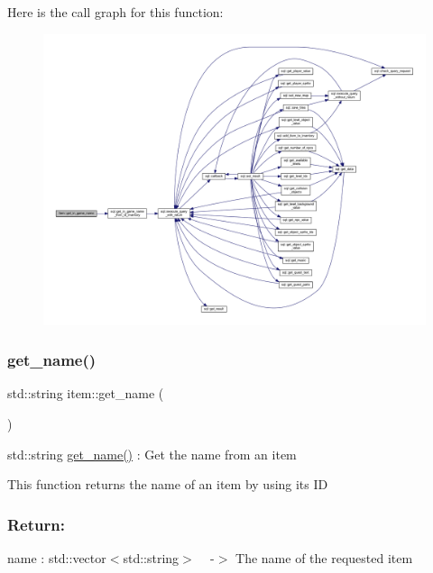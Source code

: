 Here is the call graph for this function\+:
\nopagebreak
\begin{figure}[H]
\begin{center}
\leavevmode
\includegraphics[width=350pt]{classitem_aa5a9140482a7d88d6a3eea342cb0c082_cgraph}
\end{center}
\end{figure}
\mbox{\label{classitem_ab7c2fa653e0f9a565283b60ca325f2a7}} 
\subsubsection{\texorpdfstring{get\+\_\+name()}{get\_name()}}
{\footnotesize\ttfamily std\+::string item\+::get\+\_\+name (\begin{DoxyParamCaption}{ }\end{DoxyParamCaption})}



std\+::string \hyperlink{classitem_ab7c2fa653e0f9a565283b60ca325f2a7}{get\+\_\+name()} \+: Get the name from an item 

This function returns the name of an item by using its ID

\subsubsection*{Return\+: }

name \+: std\+::vector$<$std\+::string$>$ ~\newline
-\/$>$ The name of the requested item

